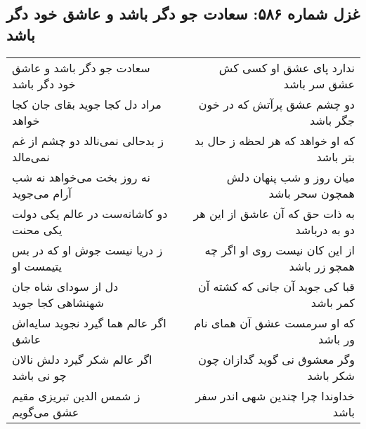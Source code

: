 \begin{center}
\section*{غزل شماره ۵۸۶: سعادت جو دگر باشد و عاشق خود دگر باشد}
\label{sec:0586}
\begin{longtable}{l p{0.5cm} r}
سعادت جو دگر باشد و عاشق خود دگر باشد
&&
ندارد پای عشق او کسی کش عشق سر باشد
\\
مراد دل کجا جوید بقای جان کجا خواهد
&&
دو چشم عشق پرآتش که در خون جگر باشد
\\
ز بدحالی نمی‌نالد دو چشم از غم نمی‌مالد
&&
که او خواهد که هر لحظه ز حال بد بتر باشد
\\
نه روز بخت می‌خواهد نه شب آرام می‌جوید
&&
میان روز و شب پنهان دلش همچون سحر باشد
\\
دو کاشانه‌ست در عالم یکی دولت یکی محنت
&&
به ذات حق که آن عاشق از این هر دو به درباشد
\\
ز دریا نیست جوش او که در بس یتیمست او
&&
از این کان نیست روی او اگر چه همچو زر باشد
\\
دل از سودای شاه جان شهنشاهی کجا جوید
&&
قبا کی جوید آن جانی که کشته آن کمر باشد
\\
اگر عالم هما گیرد نجوید سایه‌اش عاشق
&&
که او سرمست عشق آن همای نام ور باشد
\\
اگر عالم شکر گیرد دلش نالان چو نی باشد
&&
وگر معشوق نی گوید گدازان چون شکر باشد
\\
ز شمس الدین تبریزی مقیم عشق می‌گویم
&&
خداوندا چرا چندین شهی اندر سفر باشد
\\
\end{longtable}
\end{center}
